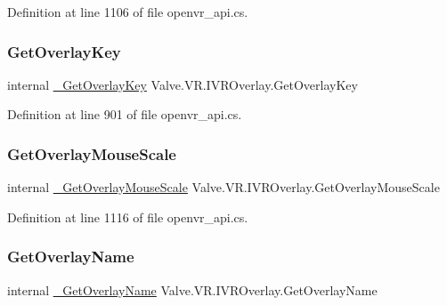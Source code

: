 Definition at line 1106 of file openvr\+\_\+api.\+cs.

\mbox{\label{struct_valve_1_1_v_r_1_1_i_v_r_overlay_a4dcb8aac0fe2d94fcf61a5133a57d58d}} 
\subsubsection{\texorpdfstring{GetOverlayKey}{GetOverlayKey}}
{\footnotesize\ttfamily internal \mbox{\hyperlink{struct_valve_1_1_v_r_1_1_i_v_r_overlay_a38178110dc53cc8ae5a125e70ab89203}{\+\_\+\+Get\+Overlay\+Key}} Valve.\+V\+R.\+I\+V\+R\+Overlay.\+Get\+Overlay\+Key}



Definition at line 901 of file openvr\+\_\+api.\+cs.

\mbox{\label{struct_valve_1_1_v_r_1_1_i_v_r_overlay_a3e8e1f0b9966106aaf90d37e2e1eeb5a}} 
\subsubsection{\texorpdfstring{GetOverlayMouseScale}{GetOverlayMouseScale}}
{\footnotesize\ttfamily internal \mbox{\hyperlink{struct_valve_1_1_v_r_1_1_i_v_r_overlay_a2b69731883d25838d42be3fe85fa64b0}{\+\_\+\+Get\+Overlay\+Mouse\+Scale}} Valve.\+V\+R.\+I\+V\+R\+Overlay.\+Get\+Overlay\+Mouse\+Scale}



Definition at line 1116 of file openvr\+\_\+api.\+cs.

\mbox{\label{struct_valve_1_1_v_r_1_1_i_v_r_overlay_a847a70a32987c6c9bd223a9baef66df7}} 
\subsubsection{\texorpdfstring{GetOverlayName}{GetOverlayName}}
{\footnotesize\ttfamily internal \mbox{\hyperlink{struct_valve_1_1_v_r_1_1_i_v_r_overlay_ac81c5dd576fe54477b02122fbad65a6b}{\+\_\+\+Get\+Overlay\+Name}} Valve.\+V\+R.\+I\+V\+R\+Overlay.\+Get\+Overlay\+Name}



